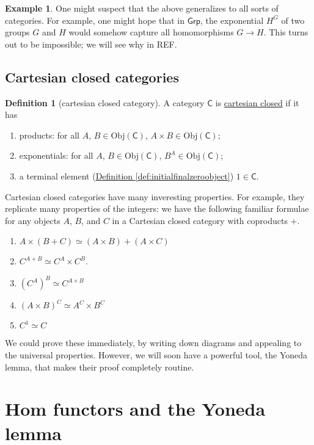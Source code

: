\documentclass[a4paper,10pt]{scrreprt}
\newcommand{\defn}[1]{\ul{#1}}
\newcommand{\Obj}{\mathrm{Obj}}
\theoremstyle{definition}
\newtheorem{definition}{Definition}[section]
\newtheorem{example}{Example}[section]
\theoremstyle{plain}
\theoremstyle{remark}
\begin{document}
\begin{example}
  One might suspect that the above generalizes to all sorts of categories. For example, one might hope that in $\mathsf{Grp}$, the exponential $H^{G}$ of two groups $G$ and $H$ would somehow capture all homomorphisms $G \to H$. This turns out to be impossible; we will see why in REF.
\end{example}

\subsection{Cartesian closed categories}
\begin{definition}[cartesian closed category]
  \label{def:cartesianclosedcategory}
  A category $\mathsf{C}$ is \defn{cartesian closed} if it has
  \begin{enumerate}
    \item products: for all $A$, $B \in \Obj(\mathsf{C})$, $A \times B \in \Obj(\mathsf{C})$;
    \item exponentials: for all $A$, $B \in \Obj(\mathsf{C})$, $B^{A} \in \Obj(\mathsf{C})$;
    \item a terminal element (\hyperref[def:initialfinalzeroobject]{Definition \ref*{def:initialfinalzeroobject}}) $1 \in \mathsf{C}$.
  \end{enumerate}
\end{definition}

Cartesian closed categories have many inveresting properties. For example, they replicate many properties of the integers: we have the following familiar formulae for any objects $A$, $B$, and $C$ in a Cartesian closed category with coproducts $+$.
\begin{enumerate} 
  \item $A \times (B + C) \simeq (A \times B) + (A \times C)$
  \item $C^{A + B} \simeq C^{A} \times C^{B}$.
  \item $(C^{A})^{B} \simeq C^{A \times B}$
  \item $(A \times B)^{C} \simeq A^{C} \times B^{C}$
  \item $C^{1} \simeq C$
\end{enumerate}

We could prove these immediately, by writing down diagrams and appealing to the universal properties. However, we will soon have a powerful tool, the Yoneda lemma, that makes their proof completely routine.

\section{Hom functors and the Yoneda lemma} \label{sec:homfunctorsandyoneda}
\end{document}
